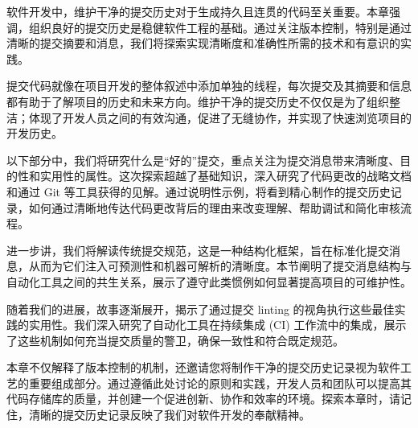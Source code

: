 软件开发中，维护干净的提交历史对于生成持久且连贯的代码至关重要。本章强调，组织良好的提交历史是稳健软件工程的基础。通过关注版本控制，特别是通过清晰的提交摘要和消息，我们将探索实现清晰度和准确性所需的技术和有意识的实践。

提交代码就像在项目开发的整体叙述中添加单独的线程，每次提交及其摘要和信息都有助于了解项目的历史和未来方向。维护干净的提交历史不仅仅是为了组织整洁；体现了开发人员之间的有效沟通，促进了无缝协作，并实现了快速浏览项目的开发历史。

以下部分中，我们将研究什么是“好的”提交，重点关注为提交消息带来清晰度、目的性和实用性的属性。这次探索超越了基础知识，深入研究了代码更改的战略文档和通过 Git 等工具获得的见解。通过说明性示例，将看到精心制作的提交历史记录，如何通过清晰地传达代码更改背后的理由来改变理解、帮助调试和简化审核流程。

进一步讲，我们将解读传统提交规范，这是一种结构化框架，旨在标准化提交消息，从而为它们注入可预测性和机器可解析的清晰度。本节阐明了提交消息结构与自动化工具之间的共生关系，展示了遵守此类惯例如何显著提高项目的可维护性。

随着我们的进展，故事逐渐展开，揭示了通过提交 linting 的视角执行这些最佳实践的实用性。我们深入研究了自动化工具在持续集成 (CI) 工作流中的集成，展示了这些机制如何充当提交质量的警卫，确保一致性和符合既定规范。

本章不仅解释了版本控制的机制，还邀请您将制作干净的提交历史记录视为软件工艺的重要组成部分。通过遵循此处讨论的原则和实践，开发人员和团队可以提高其代码存储库的质量，并创建一个促进创新、协作和效率的环境。探索本章时，请记住，清晰的提交历史记录反映了我们对软件开发的奉献精神。
